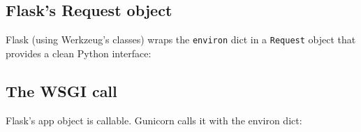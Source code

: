 \subsection*{Flask's Request object}\label{30-kernel-application-handoff:flasks-request-object}

Flask (using Werkzeug's classes) wraps the \texttt{environ} dict in a \texttt{Request} object that provides a clean Python interface:

\begin{codebox}[short]

\begin{Shaded}
\begin{Highlighting}[]

\OperatorTok{=}

\NormalTok{)  }
\end{Highlighting}
\end{Shaded}

\end{codebox}

\subsection*{The WSGI call}\label{30-kernel-application-handoff:the-wsgi-call}

Flask's app object is callable. Gunicorn calls it with the environ dict:

